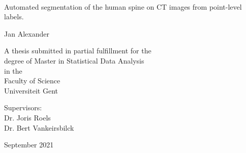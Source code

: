 
%
%
\thispagestyle{empty}

{%
\sffamily
\centering
\Large

~\vspace{\fill}

{\huge 
Automated segmentation of the human spine on CT images from point-level labels.
}

\vspace{2.5cm}

{\LARGE
Jan Alexander
}

\vspace{3.5cm}

A thesis submitted in partial fulfillment for the\\
degree of Master in Statistical Data Analysis\\[1em]
in the\\[1em]
Faculty of Science\\
Universiteit Gent

\vspace{3.5cm}

Supervisors:\\
Dr. Joris Roels\\
Dr. Bert Vankeirsbilck

\vspace{\fill}

September 2021

}%